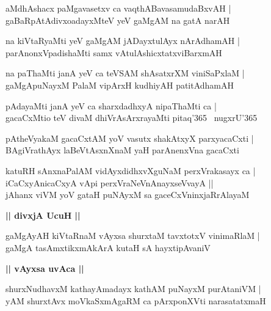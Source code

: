 \documentclass[twoside,12pt,openright]{book}
\newcounter{shloka}[chapter]
\def\uvaca#1{\centerline{{\large\textbf{#1}}}}
\begin{document}
\begin{shloka}%
aMdhAshacx paMgavasetxv ca vaqthABavasamudaBxvAH |\\
gaBaRpAtAdivxoadayxMteV yeV gaMgAM na gatA narAH 
\end{shloka}

\begin{shloka}%
na kiVtaRyaMti yeV gaMgAM jADayxtulAyx nArAdhamAH |\\
parAnonxVpadishaMti samx vAtulAshicxtatxviBarxmAH 
\end{shloka}

\begin{shloka}%
na paThaMti janA yeV ca teVSAM shAsatxrXM viniSaPxlaM |\\
gaMgApuNayxM PalaM vipArxH kudhiyAH patitAdhamAH 
\end{shloka}

\begin{shloka}%
pAdayaMti janA yeV ca sharxdadhxyA nipaThaMti ca |\\
gacaCxMtio teV divaM dhiVrAsArxrayaMti pitaq\char'365 ~nugxrU\char'365
\end{shloka}

\begin{shloka}%
pAtheVyakaM gacaCxtAM yoV vasutx shakAtxyX parxyacaCxti |\\
BAgiVrathAyx laBeVtAsxnXnaM yaH parAnenxVna gacaCxti 
\end{shloka}

\begin{shloka}%
katuRH sAnxnaPalAM vidAyxdidhxvXguNaM perxVrakasayx ca |\\
iCaCxyAnicaCxyA vApi perxVraNeVnAnayxseVvayA ||\\
jAhanx viVM yoV gataH puNAyxM sa gaceCxVninxjaRrAlayaM 
\end{shloka}

\uvaca{|| divxjA UcuH ||}

\begin{shloka}%
gaMgAyAH kiVtaRnaM vAyxsa shurxtaM tavxtotxV vinimaRlaM |\\
gaMgA tasAmxtikxmAkArA kutaH sA hayxtipAvaniV 
\end{shloka}

\uvaca{|| vAyxsa uvAca ||}

\begin{shloka}%
shurxNudhavxM kathayAmadayx kathAM puNayxM purAtaniVM |\\
yAM shurxtAvx moVkaSxmAgaRM ca pArxponXVti narasatatxmaH 
\end{shloka}
\end{document}

